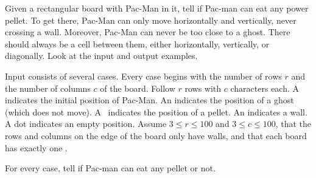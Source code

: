 

\Statement

Given a rectangular board with Pac-Man in it,
tell if Pac-man can eat any power pellet.
To get there,
Pac-Man can only move horizontally and vertically,
never crossing a wall.
Moreover, Pac-Man can never be too close to a ghost.
There should always be a cell between them,
either horizontally, vertically, or diagonally.
Look at the input and output examples.


\Input

Input consists of several cases.
Every case begins with the number of rows $r$
and the number of columns $c$ of the board.
Follow $r$ rows with $c$ characters each.
A  indicates the initial position of Pac-Man.
An  indicates the position of a ghost (which does not move).
A~ indicates the position of a pellet.
An  indicates a wall.
A dot indicates an empty position.
Assume $3 \le r \le 100$ and $3 \le c \le 100$,
that the rows and columns on the edge of the board only have walls,
and that each board has exactly one .


\Output

For every case, tell if Pac-man can eat any pellet or not.


\Sample
